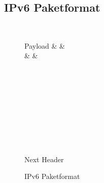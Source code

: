         \subsection{IPv6 Paketformat}
            \begin{figure}[H]
            	\centering
                \begin{bytefield}[bitwidth = 1.2em]{32}
		             \\
		            \begin{rightwordgroup}{Payload}
			             &  &  \\
			             &  &  \\
			             \\
			             \\
			             \\
			             \\
			             \\
			             \\
			             \\
			        \end{rightwordgroup} \\
		            \begin{rightwordgroup}{Next Header}
		            \end{rightwordgroup}
                \end{bytefield}
                \caption{IPv6 Paketformat}
                \label{fig:ipv6packet}
            \end{figure}
            
